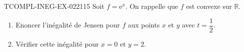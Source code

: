 \begin{exercice}{TCOMPL-INEG-EX-022}{1}{15}
Soit $f = \mathrm{e}^x$. On rappelle que $f$ est convexe sur $\mathbb{R}$.
\begin{enumerate}
  \item Enoncer l'inégalité de Jensen pour $f$ aux points $x$ et $y$ avec $t = \dfrac{1}{2}$.
  \item Vérifier cette inégalité pour $x = 0$ et $y = 2$.
\end{enumerate}

\end{exercice}
